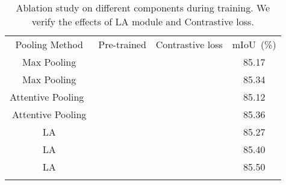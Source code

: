\documentclass[journal]{IEEEtran}
\begin{document}
\begin{table}[tbp]
\footnotesize
\caption{Ablation study on different components during training. We verify the effects of LA module and Contrastive loss. 
}   
\label{table:Contrastive loss}
\begin{center}
\resizebox{\linewidth}{!}
{
\setlength{\tabcolsep}{3pt}
\begin{tabular}{c|c|c|c}
\shline
Pooling Method & Pre-trained & Contrastive loss & mIoU~(\%) \\
\shline
Max Pooling & & & 85.17 \\
Max Pooling &  & & 85.34 \\
Attentive Pooling~\cite{hu2020randla} & & & 85.12 \\ 
{\color{black}Attentive Pooling} & {\color{black}} & {\color{black}} & {\color{black}85.36} \\ 
\hline
LA & & & 85.27 \\
LA &  & & 85.40 \\
LA &  &  & 85.50 \\ 

\shline
\end{tabular}}
\end{center}
\end{table}
\end{document}
